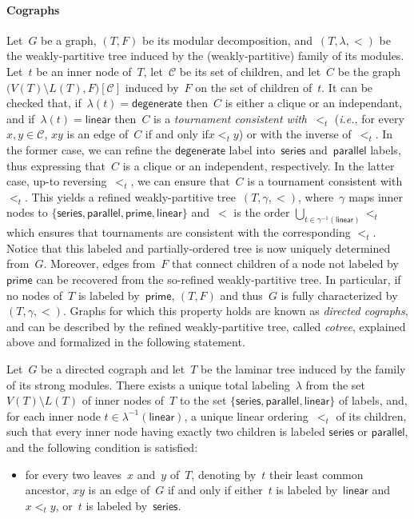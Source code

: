 \documentclass{lmcs} %
\newcommand*\defd[2][\em\color{red!25!black}]{{#1#2}}
\newcommand\DEGENERATE{\ensuremath{\mathsf{degenerate}}\xspace}
\newcommand\PRIME{\ensuremath{\mathsf{prime}}\xspace}
\newcommand\LINEAR{\ensuremath{\mathsf{linear}}\xspace}
\newcommand\SERIES{\ensuremath{\mathsf{series}}\xspace}
\newcommand\PARALLEL{\ensuremath{\mathsf{parallel}}\xspace}
\newcommand{\ifof}{if and only if\xspace}
\def\ie{{\em i.e.}}
\begin{document}
\paragraph*{Cographs}
Let~$G$ be a graph, $(T,F)$ be its modular decomposition,
and~$(T,\lambda,<)$ be the weakly-partitive tree induced by the (weakly-partitive) family of its modules.
Let~$t$ be an inner node of~$T$, let~$\mathcal{C}$ be its set of children,
and let~$C$ be the graph~$\big(V(T)\setminus L(T), F\big)\left[\mathcal{C}\right]$ induced by~$F$ on the set of children of~$t$.
It can be checked that,
if~$\lambda(t)=\DEGENERATE$ then~$C$ is either a clique or an independant,
and if~$\lambda(t)=\LINEAR$ then~$C$ is a \emph{tournament consistent with~$<_t$}
(\ie, for every $x,y\in\mathcal{C}$, $xy$ is an edge of~$C$ \ifof $x<_t y$)
or with the inverse of~$<_t$.
In the former case,
we can refine the $\DEGENERATE$ label into~$\SERIES$ and~$\PARALLEL$ labels,
thus expressing that~$C$ is a clique or an independent, respectively.
In the latter case, up-to reversing~$<_t$,
we can ensure that~$C$ is a tournament consistent with~$<_t$.
This yields a refined weakly-partitive tree~$(T,\gamma,<)$,
where~$\gamma$ maps inner nodes to $\{\SERIES,\PARALLEL,\PRIME,\LINEAR\}$
and~$<$ is the order $\bigcup_{t\in\gamma^{-1}(\LINEAR)}<_t$
which ensures that tournaments are consistent with the corresponding $<_t$.
Notice that this labeled and partially-ordered tree is now uniquely determined from~$G$.
Moreover, edges from~$F$ that connect children of a node not labeled by~$\PRIME$
can be recovered from the so-refined weakly-partitive tree.
In particular, if no nodes of~$T$ is labeled by~$\PRIME$,
$(T,F)$ and thus~$G$ is fully characterized by~$(T,\gamma,<)$.
Graphs for which this property holds
are known as \defd{directed cographs},
and can be described by the refined weakly-partitive tree, called \defd{cotree}, explained above and formalized in the following statement.
\begin{thm}
    \label{thm:cotree}
    Let~$G$ be a directed cograph and let~$T$ be the laminar tree induced by the family of its strong modules.
    There exists a unique total labeling~$\lambda$ from the set~$V(T)\setminus L(T)$ of inner nodes of~$T$
    to the set $\{\SERIES,\PARALLEL,\LINEAR\}$ of labels,
    and, for each inner node $t\in\lambda^{-1}(\LINEAR)$,
    a unique linear ordering~$<_t$ of its children,
    such that every inner node having exactly two children is labeled $\SERIES$ or $\PARALLEL$,
    and the following condition is satisfied:
    \begin{itemize}[nosep]
        \item for every two leaves~$x$ and~$y$ of~$T$,
            denoting by~$t$ their least common ancestor,
            $xy$ is an edge of~$G$
            \ifof
            either~$t$ is labeled by~$\LINEAR$ and~$x<_ty$,
            or~$t$ is labeled by~$\SERIES$.
    \end{itemize}
\end{thm}
\end{document}
